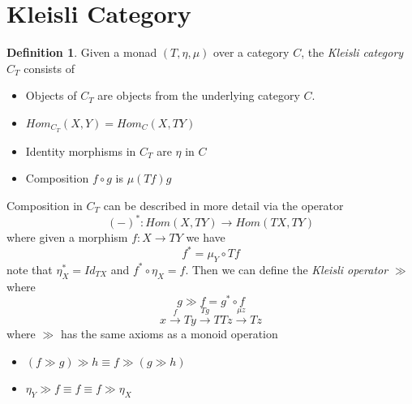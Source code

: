\documentclass{article}
\theoremstyle{definition}
\newtheorem{definition}{Definition}[section]
\begin{document}
\section{Kleisli Category}
\begin{definition}
    Given a monad $(T,\eta,\mu)$ over a category $C$,
    the \textit{Kleisli category} $C_T$ consists of
    \begin{itemize}
        \item Objects of $C_T$ are objects from the underlying category $C$.
        \item $Hom_{C_T}(X,Y) = Hom_C (X,TY)$
        \item Identity morphisms in $C_T$ are $\eta$ in $C$
        \item Composition $f \circ g$ is $\mu(Tf)g$
    \end{itemize}
\end{definition}

Composition in $C_T$ can be described in more detail via the operator
$$(-)^{*} : Hom(X, TY) \rightarrow Hom(TX, TY)$$
where given a morphism $f: X \rightarrow TY$ we have
$$f^{*} = \mu_{Y} \circ Tf$$
note that
$\eta_{X}^{*} = Id_{TX}$
and
$f^{*} \circ \eta _{X} = f$.
Then we can define the \textit{Kleisli operator} $\gg$ where
$$g \gg f = g^{*} \circ f$$
\begin{displaymath}
    x
    \stackrel{f}{\rightarrow}     T y
    \stackrel{T g}{\rightarrow}   T T z
    \stackrel{\mu z}{\rightarrow} T z
\end{displaymath}
where $\gg$ has the same axioms as a monoid operation
\begin{itemize}
    \item $(f \gg g) \gg h \equiv f \gg (g \gg h)$
    \item $\eta_Y \gg f \equiv f \equiv f \gg \eta_X$
\end{itemize}
\end{document}
